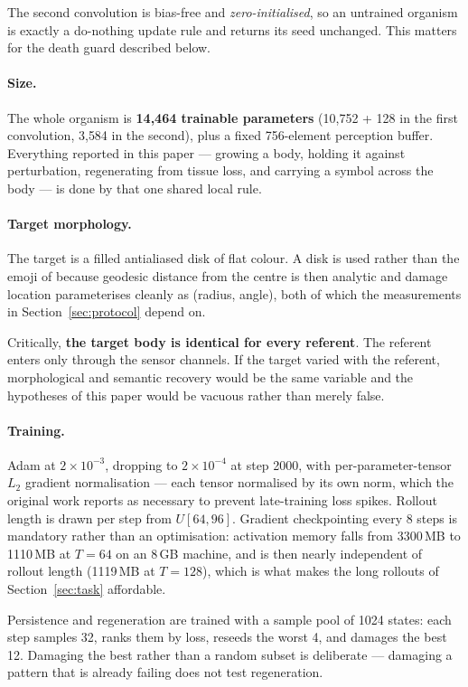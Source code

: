 The second convolution is bias-free and \emph{zero-initialised}, so an untrained
organism is exactly a do-nothing update rule and returns its seed unchanged.
This matters for the death guard described below.

\paragraph{Size.} The whole organism is \textbf{14{,}464 trainable parameters}
(10{,}752 + 128 in the first convolution, 3{,}584 in the second), plus a fixed
756-element perception buffer. Everything reported in this paper --- growing a
body, holding it against perturbation, regenerating from tissue loss, and
carrying a symbol across the body --- is done by that one shared local rule.

\paragraph{Target morphology.} The target is a filled antialiased disk of flat
colour. A disk is used rather than the emoji of
\citet{mordvintsev2020growing} because geodesic distance from the centre is then
analytic and damage location parameterises cleanly as (radius, angle), both of
which the measurements in Section~\ref{sec:protocol} depend on.

Critically, \textbf{the target body is identical for every referent}. The
referent enters only through the sensor channels. If the target varied with the
referent, morphological and semantic recovery would be the same variable and the
hypotheses of this paper would be vacuous rather than merely false.

\paragraph{Training.} Adam at $2\times10^{-3}$, dropping to $2\times10^{-4}$ at
step 2000, with per-parameter-tensor $L_2$ gradient normalisation --- each tensor
normalised by its own norm, which the original work reports as necessary to
prevent late-training loss spikes. Rollout length is drawn per step from
$U[64,96]$. Gradient checkpointing every 8 steps is mandatory rather than an
optimisation: activation memory falls from 3300\,MB to 1110\,MB at $T=64$ on an
8\,GB machine, and is then nearly independent of rollout length (1119\,MB at
$T=128$), which is what makes the long rollouts of Section~\ref{sec:task}
affordable.

Persistence and regeneration are trained with a sample pool of 1024 states: each
step samples 32, ranks them by loss, reseeds the worst 4, and damages the best
12. Damaging the best rather than a random subset is deliberate --- damaging a
pattern that is already failing does not test regeneration.

